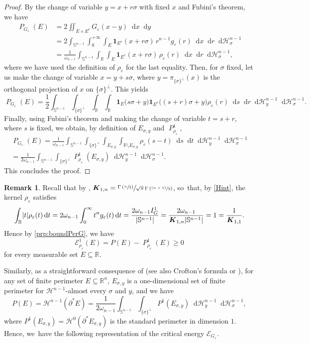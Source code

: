 \documentclass[JEP,XML,SOM,Unicode,published]{cedram}
\newcommand{\psfrac}[2]{\sfrac{(#1)}{#2}}
\numberwithin{equation}{section}
\theoremstyle{plain}
\theoremstyle{definition}
\newtheorem{rmk}[thm]{Remark}
\newcommand{\numberset}[1]{{\mathbb{#1}}}
\newcommand{\R}{\numberset{R}}
\newcommand{\dx}{\mathop{}\mathopen{}\mathrm{d}x}
\newcommand{\dy}{\mathop{}\mathopen{}\mathrm{d}y}
\newcommand{\dt}{\mathop{}\mathopen{}\mathrm{d}t}
\newcommand{\dr}{\mathop{}\mathopen{}\mathrm{d}r}
\newcommand{\ds}{\mathop{}\mathopen{}\mathrm{d}s}
\newcommand{\dH}{\mathop{}\mathopen{}\mathrm{d}\mathscr{H}}
\newcommand{\bbS}{\mathbb{S}}
\newcommand{\bfK}{\boldsymbol{K}}
\newcommand{\calE}{{\mathcal{E}}}
\newcommand{\calH}{{\mathscr{H}}}
\let\om\omega
\let\eps\varepsilon
\newcommand{\ind}{{\mathbf{1}}}
\newcommand{\compl}{{\mathrm{c}}}
\newcommand{\subsq}{\subseteq}
\DeclareMathOperator{\Per}{\mathit{P}}
\DeclarePairedDelimiter{\abs}{\lvert}{\rvert}
\begin{document}
\begin{proof}
By the change of variable $y=x+r\sigma$ with fixed $x$ and Fubini's theorem, we have
\[
\begin{aligned}
\Per_{G_\eps}(E)
&= 2\iint_{E\times E^\compl} G_\eps(x-y)\dx\dy\\
&= 2\int_{\bbS^{n-1}} \int_0^{+\infty} \int_E \ind_{E^\compl}(x+r\sigma)\, r^{n-1}g_\eps(r)
\dx\dr\dH^{n-1}_\sigma\\
&=\frac{1}{\om_{n-1}}\int_{\bbS^{n-1}} \int_\R \int_E \ind_{E^\compl}(x+r\sigma)\,
\rho_\eps(r)\dx\dr\dH^{n-1}_\sigma,
\end{aligned}
\]
where we have used the definition of $\rho_\eps$ for the last equality.
Then, for $\sigma$ fixed, let us make the change of variable $x=y+s\sigma$, where
$y=\pi_{\{\sigma\}^\perp}(x)$ is the orthogonal projection of $x$ on $\{\sigma\}^\perp$.
This yields
\[
\Per_{G_\eps}(E) = \frac{1}{2}\int_{\bbS^{n-1}}\int_{\{\sigma\}^\perp} \int_\R \int_\R
\ind_E\big(s\sigma+y\big)\ind_{E^\compl}\big((s+r)\sigma+y\big) \rho_\eps(r)
\ds\dr\dH^{n-1}_y\dH^{n-1}_\sigma.
\]
Finally, using Fubini's theorem and making the change of variable $t=s+r$, where $s$ is fixed, we
obtain, by definition of $E_{\sigma,y}$ and $\Per_{\rho_\eps}^1$,
\begin{multline*}
\Per_{G_\eps}(E) =
\frac{1}{\om_{n-1}}\int_{\bbS^{n-1}}\int_{\{\sigma\}^\perp}\int_{E_{\sigma,y}}
\int_{\R\setminus E_{\sigma,y}} \rho_\eps(s-t) \ds\dt\dH^{n-1}_y\dH^{n-1}_\sigma\\
=\frac{1}{2\om_{n-1}}\int_{\bbS^{n-1}}\int_{\{\sigma\}^\perp}\Per^1_{\rho_\eps}(E_{\sigma,y})
\dH^{n-1}_y \dH^{n-1}_\sigma.
\end{multline*}
This concludes the proof.
\end{proof}

\begin{rmk}\label{rmk:PerGbound}
Recall that by \cite[Lem.\,3.13]{Peg2021},
$\bfK_{1,n}=\sfrac{\Gamma\left(\sfrac{n}{2}\right)}{\sqrt{\pi}\,\Gamma\left(\psfrac{n+1}{2}\right)}$,
so~that, by \cref{Hint}, the kernel $\rho_\eps$ satisfies
\[
\int_{\R} \abs{t}\rho_\eps(t)\dt
=2\om_{n-1}\int_0^\infty t^ng_\eps(t)\dt
=\frac{2\om_{n-1}I_G^1}{\abs{\bbS^{n-1}}}=\frac{2\om_{n-1}}{\bfK_{1,n}\abs{\bbS^{n-1}}}
=1
=\frac{1}{\bfK_{1,1}}.
\]
Hence by \cref{prp:boundPerG}, we have
\[
\calE^1_{\rho_\eps}(E)= P(E)-\Per^1_{\rho_\eps}(E)\geq 0
\]
for every measurable set $E\subsq\R$.
\end{rmk}

Similarly, as a straightforward consequence of \cite[Th.\,3.103]{AFP2000} (see also
Crofton's formula \cite[\S 3.16]{Mor2016} or \cite[Th.\,3.2.26]{Fed1996}),
for any set of finite perimeter $E\subsq\R^{n}$, $E_{\sigma,y}$ is a one-dimensional set of
finite perimeter for $\calH^{n-1}$-almost every $\sigma$ and $y$, and we have
\[
P(E)=\calH^{n-1}(\partial^* E)=\frac{1}{2\om_{n-1}}\int_{\bbS^{n-1}} \int_{\{\sigma\}^\perp}
P^1(E_{\sigma,y})\dH_y^{n-1}\dH^{n-1}_\sigma,
\]
where $P^1(E_{\sigma,y})=\calH^0(\partial^* E_{\sigma,y})$ is the standard perimeter in dimension
$1$. Hence, we~have the following representation of the critical energy $\calE_{G_\eps}$.
\end{document}
